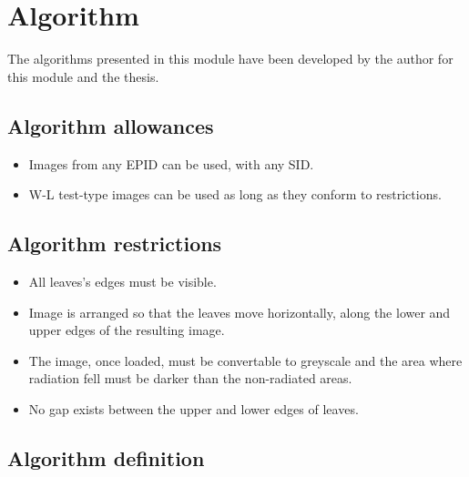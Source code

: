 \pagebreak

\section{Algorithm}

The algorithms presented in this module have been developed by the author for this module and the thesis.

\subsection{Algorithm allowances}

\begin{itemize}

    \item Images from any EPID can be used, with any SID.
    
    \item W-L test-type images can be used as long as they conform to restrictions.
    
\end{itemize}

\subsection{Algorithm restrictions} \label{subsec:laAlgoritmRestrictions}

\begin{itemize}

    \item All leaves's edges must be visible.

    \item Image is arranged so that the leaves move horizontally, along the lower and upper edges of the resulting image.

    \item The image, once loaded, must be convertable to greyscale and the area where radiation fell must be darker than the non-radiated areas.

    \item No gap exists between the upper and lower edges of leaves.
    
\end{itemize}

\subsection{Algorithm definition}

